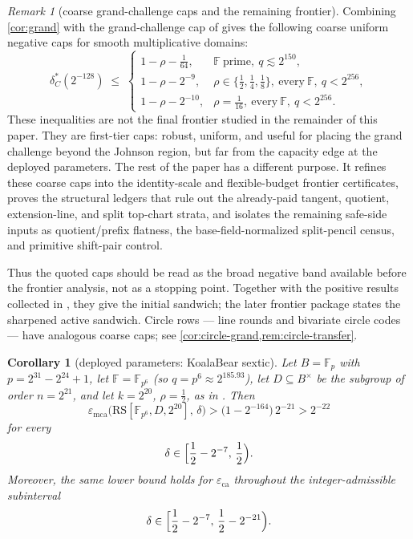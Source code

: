 \documentclass[11pt]{article}
\newtheorem{corollary}[corollary]{Corollary}
\theoremstyle{definition}
\theoremstyle{remark}
\newtheorem{remark}[remark]{Remark}
\newcommand{\F}{\mathbb{F}}
\newcommand{\B}{B}
\newcommand{\RS}{\mathrm{RS}}
\newcommand{\eca}{\varepsilon_{\mathrm{ca}}}
\newcommand{\emca}{\varepsilon_{\mathrm{mca}}}
\begin{document}
\begin{remark}[coarse grand-challenge caps and the remaining frontier]\label{rem:twotier}
Combining \cref{cor:grand} with the grand-challenge cap of \cite[Prop.\ ``Grand-challenge cap'']{Cho26b} gives the following coarse uniform negative caps for smooth multiplicative domains:
\[
\delta^*_C(2^{-128})\;\le\;
\begin{cases}
1-\rho-\frac1{64}, & \F\ \text{prime},\ q\lesssim2^{150},\\[2pt]
1-\rho-2^{-9}, & \rho\in\{\frac12,\frac14,\frac18\},\ \text{every}\ \F,\ q<2^{256},\\[2pt]
1-\rho-2^{-10}, & \rho=\frac1{16},\ \text{every}\ \F,\ q<2^{256}.
\end{cases}
\]
These inequalities are not the final frontier studied in the remainder of this paper.  They are first-tier caps: robust, uniform, and useful for placing the grand challenge beyond the Johnson region, but far from the capacity edge at the deployed parameters.  The rest of the paper has a different purpose.  It refines these coarse caps into the identity-scale and flexible-budget frontier certificates, proves the structural ledgers that rule out the already-paid tangent, quotient, extension-line, and split top-chart strata, and isolates the remaining safe-side inputs as quotient/prefix flatness, the base-field-normalized split-pencil census, and primitive shift-pair control.

Thus the quoted caps should be read as the broad negative band available before the frontier analysis, not as a stopping point.  Together with the positive results collected in \cite[Table~1]{ABF26}, they give the initial sandwich; the later frontier package states the sharpened active sandwich.  Circle rows --- line rounds and bivariate circle codes --- have analogous coarse caps; see \cref{cor:circle-grand,rem:circle-transfer}.
\end{remark}

\begin{corollary}[deployed parameters: KoalaBear sextic]\label{cor:deployed}
Let $\B=\F_p$ with $p=2^{31}-2^{24}+1$, let $\F=\F_{p^6}$ (so $q=p^6\approx2^{185.93}$), let $D\subseteq\B^\times$ be the subgroup of order $n=2^{21}$, and let $k=2^{20}$, $\rho=\frac12$, as in \cite[\S6.3]{ABF26}. Then
\[
\emca\bigl(\RS[\F_{p^6},D,2^{20}],\,\delta\bigr)
>
\bigl(1-2^{-164}\bigr)\,2^{-21}
>
2^{-22}
\]
for every
\[
        \delta\in\Bigl[\frac12-2^{-7},\,\frac12\Bigr).
\]
Moreover, the same lower bound holds for $\eca$ throughout the integer-admissible subinterval
\[
        \delta\in
        \Bigl[\frac12-2^{-7},\,\frac12-2^{-21}\Bigr).
\]
\end{corollary}
\end{document}
